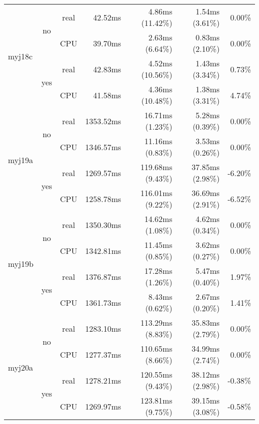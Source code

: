 \documentclass[en]{pracamgr}
\begin{document}
\begin{small}
\begin{longtable}{|l|c|c|r|r|r|r|}
\hline
\multirow{4}{*}{myj18c}   & \multirow{2}{*}{no}  & real & 42.52ms & 4.86ms (11.42\%) & 1.54ms (3.61\%) & 0.00\% \\*
                          &                      & CPU  & 39.70ms & 2.63ms (6.64\%) & 0.83ms (2.10\%) & 0.00\% \\*
                          \cline{2-7}
                          & \multirow{2}{*}{yes} & real & 42.83ms & 4.52ms (10.56\%) & 1.43ms (3.34\%) & 0.73\% \\*
                          &                      & CPU  & 41.58ms & 4.36ms (10.48\%) & 1.38ms (3.31\%) & 4.74\% \\
\hline
\multirow{4}{*}{myj19a}   & \multirow{2}{*}{no}  & real & 1353.52ms & 16.71ms (1.23\%) & 5.28ms (0.39\%) & 0.00\% \\*
                          &                      & CPU  & 1346.57ms & 11.16ms (0.83\%) & 3.53ms (0.26\%) & 0.00\% \\*
                          \cline{2-7}
                          & \multirow{2}{*}{yes} & real & 1269.57ms & 119.68ms (9.43\%) & 37.85ms (2.98\%) & -6.20\% \\*
                          &                      & CPU  & 1258.78ms & 116.01ms (9.22\%) & 36.69ms (2.91\%) & -6.52\% \\
\hline
\multirow{4}{*}{myj19b}   & \multirow{2}{*}{no}  & real & 1350.30ms & 14.62ms (1.08\%) & 4.62ms (0.34\%) & 0.00\% \\*
                          &                      & CPU  & 1342.81ms & 11.45ms (0.85\%) & 3.62ms (0.27\%) & 0.00\% \\*
                          \cline{2-7}
                          & \multirow{2}{*}{yes} & real & 1376.87ms & 17.28ms (1.26\%) & 5.47ms (0.40\%) & 1.97\% \\*
                          &                      & CPU  & 1361.73ms & 8.43ms (0.62\%) & 2.67ms (0.20\%) & 1.41\% \\
\hline
\multirow{4}{*}{myj20a}   & \multirow{2}{*}{no}  & real & 1283.10ms & 113.29ms (8.83\%) & 35.83ms (2.79\%) & 0.00\% \\*
                          &                      & CPU  & 1277.37ms & 110.65ms (8.66\%) & 34.99ms (2.74\%) & 0.00\% \\*
                          \cline{2-7}
                          & \multirow{2}{*}{yes} & real & 1278.21ms & 120.55ms (9.43\%) & 38.12ms (2.98\%) & -0.38\% \\*
                          &                      & CPU  & 1269.97ms & 123.81ms (9.75\%) & 39.15ms (3.08\%) & -0.58\% \\

\end{longtable}
\end{small}
\end{document}
